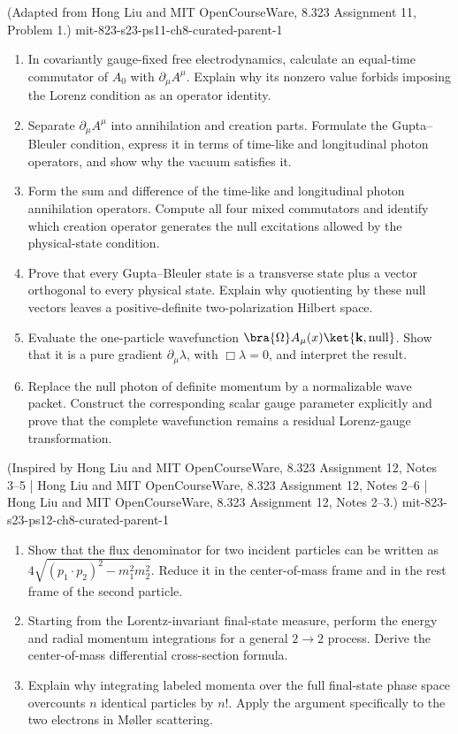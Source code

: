\begin{enumerate}
  {(Adapted from Hong Liu and MIT OpenCourseWare, 8.323 Assignment 11, Problem 1.)}
  {mit-823-s23-ps11-ch8-curated-parent-1}
\begin{enumerate}
\item
In covariantly gauge-fixed free electrodynamics, calculate an equal-time
commutator of \(A_0\) with \(\partial_\mu A^\mu\).  Explain why its nonzero
value forbids imposing the Lorenz condition as an operator identity.
\item
Separate \(\partial_\mu A^\mu\) into annihilation and creation parts.
Formulate the Gupta--Bleuler condition, express it in terms of time-like and
longitudinal photon operators, and show why the vacuum satisfies it.
\item
Form the sum and difference of the time-like and longitudinal photon
annihilation operators.  Compute all four mixed commutators and identify
which creation operator generates the null excitations allowed by the
physical-state condition.
\item
Prove that every Gupta--Bleuler state is a transverse state plus a vector
orthogonal to every physical state.  Explain why quotienting by these null
vectors leaves a positive-definite two-polarization Hilbert space.
\item
Evaluate the one-particle wavefunction
\(\bra{\Omega}A_\mu(x)\ket{\mathbf k,\mathrm{null}}\).
Show that it is a pure gradient \(\partial_\mu\lambda\), with
\(\Box\lambda=0\), and interpret the result.
\item
Replace the null photon of definite momentum by a normalizable wave packet.
Construct the corresponding scalar gauge parameter explicitly and prove
that the complete wavefunction remains a residual Lorenz-gauge
transformation.
\end{enumerate}

  {(Inspired by Hong Liu and MIT OpenCourseWare, 8.323 Assignment 12, Notes 3--5 | Hong Liu and MIT OpenCourseWare, 8.323 Assignment 12, Notes 2--6 | Hong Liu and MIT OpenCourseWare, 8.323 Assignment 12, Notes 2--3.)}
  {mit-823-s23-ps12-ch8-curated-parent-1}
\begin{enumerate}
\item
Show that the flux denominator for two incident particles can be written as
\(4\sqrt{(p_1\cdot p_2)^2-m_1^2m_2^2}\).  Reduce it in the center-of-mass
frame and in the rest frame of the second particle.
\item
Starting from the Lorentz-invariant final-state measure, perform the energy
and radial momentum integrations for a general \(2\to2\) process.  Derive
the center-of-mass differential cross-section formula.
\item
Explain why integrating labeled momenta over the full final-state phase
space overcounts \(n\) identical particles by \(n!\).  Apply the argument
specifically to the two electrons in Møller scattering.
\end{enumerate}


\end{enumerate}
